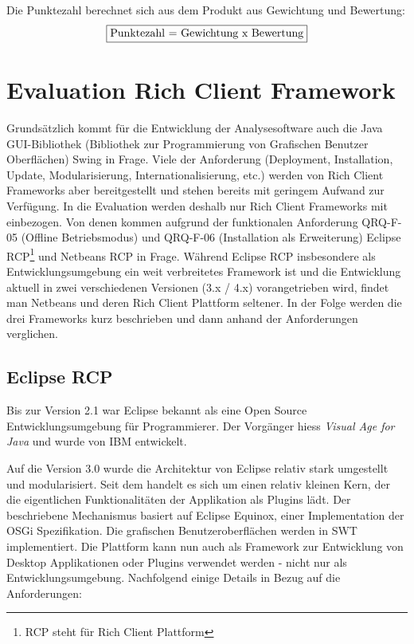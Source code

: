 Die Punktezahl berechnet sich aus dem Produkt aus Gewichtung und Bewertung:
 \begin{align*}
\fbox{Punktezahl = Gewichtung x Bewertung}
\end{align*}
\section{Evaluation Rich Client Framework}
Grundsätzlich kommt für die Entwicklung der Analysesoftware auch die Java GUI-Bibliothek (Bibliothek zur Programmierung von Grafischen Benutzer Oberflächen) Swing in Frage. Viele der Anforderung (Deployment, Installation, Update, Modularisierung, Internationalisierung, etc.) werden von Rich Client Frameworks aber bereitgestellt und stehen bereits mit geringem Aufwand zur Verfügung. In die Evaluation werden deshalb nur Rich Client Frameworks mit einbezogen. Von denen kommen aufgrund der funktionalen Anforderung QRQ-F-05 (Offline Betriebsmodus) und QRQ-F-06 (Installation als Erweiterung) Eclipse RCP\footnote{RCP steht für Rich Client Plattform} und Netbeans RCP in Frage. Während Eclipse RCP insbesondere als Entwicklungsumgebung ein weit verbreitetes Framework ist und die Entwicklung aktuell in zwei verschiedenen Versionen (3.x / 4.x) vorangetrieben wird, findet man Netbeans und deren Rich Client Plattform seltener. In der Folge werden die drei Frameworks kurz beschrieben und dann anhand der Anforderungen verglichen.


\subsection{Eclipse RCP}
Bis zur Version 2.1 war Eclipse bekannt als eine Open Source Entwicklungsumgebung für Programmierer. Der Vorgänger hiess \textit{Visual Age for Java} und wurde von IBM entwickelt. 

Auf die Version 3.0 wurde die Architektur von Eclipse relativ stark umgestellt und modularisiert. Seit dem handelt es sich um einen relativ kleinen Kern, der die eigentlichen Funktionalitäten der Applikation als Plugins lädt. Der beschriebene Mechanismus basiert auf Eclipse Equinox, einer Implementation der OSGi Spezifikation. Die grafischen Benutzeroberflächen werden in SWT implementiert. Die Plattform kann nun auch als Framework zur Entwicklung von Desktop Applikationen oder Plugins verwendet werden - nicht nur als Entwicklungsumgebung. Nachfolgend einige Details in Bezug auf die Anforderungen:

